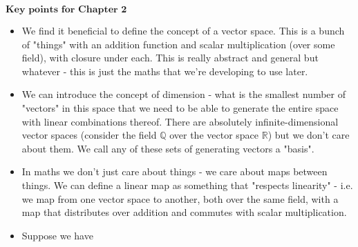 \documentclass{article}
\begin{document}
	$\textbf{Key points for Chapter 2}$
	\begin{itemize}
		
		\item We find it beneficial to define the concept of a vector space. This is a bunch of "things" with an addition function and scalar multiplication (over some field), with closure under each. This is really abstract and general but whatever - this is just the maths that we're developing to use later.
		
		\item We can introduce the concept of dimension - what is the smallest number of "vectors" in this space that we need to be able to generate the entire space with linear combinations thereof. There are absolutely infinite-dimensional vector spaces (consider the field $\mathbb{Q}$ over the vector space $\mathbb{R}$) but we don't care about them. We call any of these sets of generating vectors a "basis".
		
		\item In maths we don't just care about things - we care about maps between things. We can define a linear map as something that "respects linearity" - i.e. we map from one vector space to another, both over the same field, with a map that distributes over addition and commutes with scalar multiplication.
		
		\item Suppose we have 
	\end{itemize}
\end{document}
